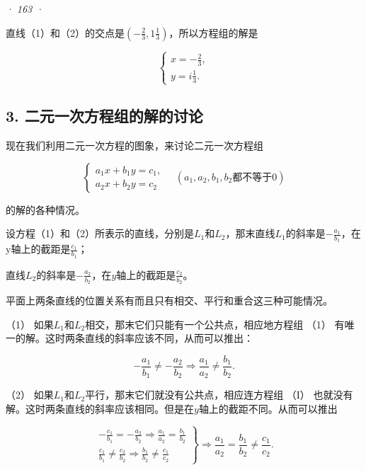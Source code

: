 \emph{· 163 ·}

直线（1）和（2）的交点是\(\left(-\frac{2}{3},1\frac{1}{3}\right)\)，所以方程组的解是

\[
\left\{ \begin{array}{l} x = - \frac{2}{3}, \\ y = i \frac{1}{3}. \end{array} \right.
\]

\subsection{3. 二元一次方程组的解的讨论}

现在我们利用二元一次方程的图象，来讨论二元一次方程组

\[
\left\{ \begin{array}{l} a_{1} x + b_{1} y = c_{1}, \\ a_{2} x + b_{2} y = c_{2} \end{array} \right. \quad (a_{1}, a_{2}, b_{1}, b_{2} \text{都不等于0}) \tag {1}
\]

的解的各种情况。

设方程（1）和（2）所表示的直线，分别是\(L_{1}\)和\(L_{2}\)，那末直线\(L_{1}\)的斜率是\(-\frac{a_{1}}{b_{1}}\)，在y轴上的截距是\(\frac{c_{1}}{b_{1}}\)；

直线\(L_{2}\)的斜率是\(-\frac{a_{2}}{b_{2}}\)，在\(y\)轴上的截距是\(\frac{c_{2}}{b_{2}}\)。

平面上两条直线的位置关系有而且只有相交、平行和重合这三种可能情况。

（1）
如果\(L_{1}\)和\(L_{2}\)相交，那末它们只能有一个公共点，相应地方程组
（1） 有唯一的解。这时两条直线的斜率应该不同，从而可以推出：

\[
- \frac{a_{1}}{b_{1}} \neq - \frac{a_{2}}{b_{2}} \Rightarrow \frac{a_{1}}{a_{2}} \neq \frac{b_{1}}{b_{2}}.
\]

（2） 如果\(L_{1}\)和\(L_{2}\)平行，那末它们就没有公共点，相应连方程组
（I）
也就没有解。这时两条直线的斜率应该相同。但是在\(y\)轴上的截距不同。从而可以推出

\[
\left. \begin{array}{l} - \frac{c_{1}}{b_{1}} = - \frac{a_{2}}{b_{2}} \Rightarrow \frac{a_{1}}{a_{2}} = \frac{b_{1}}{b_{2}} \\ \frac{c_{1}}{b_{1}} \neq \frac{c_{2}}{b_{2}} \Rightarrow \frac{b_{1}}{b_{2}} \neq \frac{c_{1}}{c_{2}} \end{array} \right\} \Rightarrow \frac{a_{1}}{a_{2}} = \frac{b_{1}}{b_{2}} \neq \frac{c_{1}}{c_{2}}.
\]

